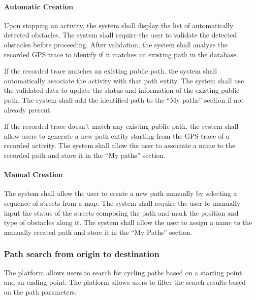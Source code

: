 \paragraph{Automatic Creation}
\begin{itemize}
    \req Upon stopping an activity, the system shall display the list of automatically detected obstacles.
    \req The system shall require the user to validate the detected obstacles before proceeding.
    \req After validation, the system shall analyze the recorded GPS trace to identify if it matches an existing path in the database.
    
    \req If the recorded trace matches an existing public path, the system shall automatically associate the activity with that path entity.
    \req The system shall use the validated data to update the status and information of the existing public path.
    \req The system shall add the identified path to the ``My paths'' section if not already present.
    
    \req If the recorded trace doesn't match any existing public path, the system shall allow users to generate a new path entity starting from the GPS trace of a recorded activity.
    \req The system shall allow the user to associate a name to the recorded path and store it in the ``My paths'' section.
\end{itemize}

\paragraph{Manual Creation}
\begin{itemize}
    \req The system shall allow the user to create a new path manually by selecting a sequence of streets from a map.
    \req The system shall require the user to manually input the status of the streets composing the path and mark the position and type of obstacles along it.
    \req The system shall allow the user to assign a name to the manually created path and store it in the ``My Paths'' section.
\end{itemize}

\subsubsection{Path search from origin to destination}
\begin{itemize}
    \req The platform allows users to search for cycling paths based on a starting point and an ending point.
    \req The platform allows users to filter the search results based on the path parameters.
\end{itemize}


